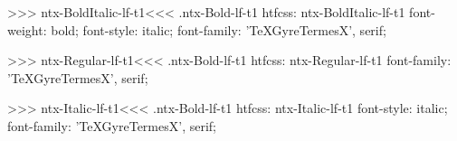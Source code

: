 >>>
\<ntx-BoldItalic-lf-t1\><<<
.ntx-Bold-lf-t1
htfcss:  ntx-BoldItalic-lf-t1  font-weight: bold; font-style: italic; font-family: 'TeXGyreTermesX', serif;

>>>
\<ntx-Regular-lf-t1\><<<
.ntx-Bold-lf-t1
htfcss:  ntx-Regular-lf-t1  font-family: 'TeXGyreTermesX', serif;

>>>
\<ntx-Italic-lf-t1\><<<
.ntx-Bold-lf-t1
htfcss:  ntx-Italic-lf-t1  font-style: italic; font-family: 'TeXGyreTermesX', serif;

